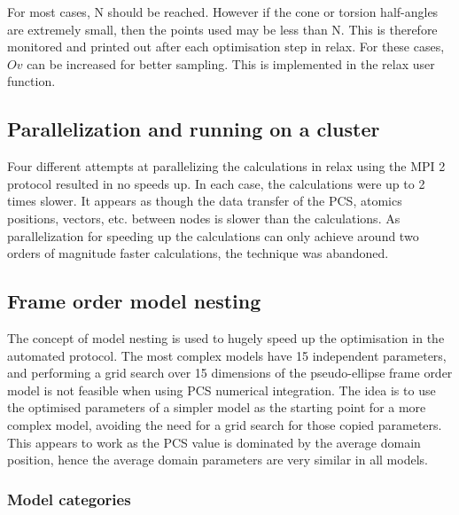 For most cases, N should be reached.
However if the cone or torsion half-angles are extremely small, then the points used may be less than N.
This is therefore monitored and printed out after each optimisation step in relax.
For these cases, $Ov$ can be increased for better sampling.
This is implemented in the relax  user function.





\subsection{Parallelization and running on a cluster}

Four different attempts at parallelizing the calculations in relax using the MPI 2 protocol resulted in no speeds up.
In each case, the calculations were up to 2 times slower.
It appears as though the data transfer of the PCS, atomics positions, vectors, etc. between nodes is slower than the calculations.
As parallelization for speeding up the calculations can only achieve around two orders of magnitude faster calculations, the technique was abandoned.





\subsection{Frame order model nesting}

The concept of model nesting is used to hugely speed up the optimisation in the automated protocol.
The most complex models have 15 independent parameters, and performing a grid search over 15 dimensions of the pseudo-ellipse frame order model is not feasible when using PCS numerical integration.
The idea is to use the optimised parameters of a simpler model as the starting point for a more complex model, avoiding the need for a grid search for those copied parameters.
This appears to work as the PCS value is dominated by the average domain position, hence the average domain parameters are very similar in all models.


\subsubsection{Model categories}

